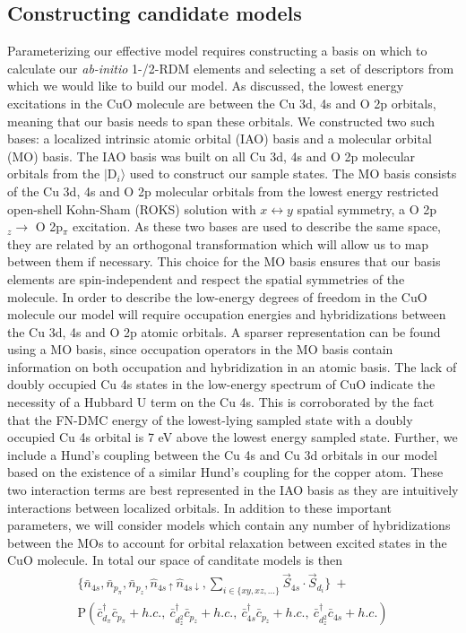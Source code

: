 \documentclass{article}
\begin{document}
\subsection{Constructing candidate models}
Parameterizing our effective model requires constructing a basis on which to calculate our \textit{ab-initio} 1-/2-RDM elements and selecting a set of descriptors from which we would like to build our model.
As discussed, the lowest energy excitations in the CuO molecule are between the Cu 3d, 4s and O 2p orbitals, meaning that our basis needs to span these orbitals. 
We constructed two such bases: a localized intrinsic atomic orbital (IAO) basis and a molecular orbital (MO) basis.
The IAO basis was built on all Cu 3d, 4s and O 2p molecular orbitals from the $|\text{D}_i\rangle$ used to construct our sample states.
The MO basis consists of the Cu 3d, 4s and O 2p molecular orbitals from the lowest energy restricted open-shell Kohn-Sham (ROKS) solution with $x \leftrightarrow y$ spatial symmetry, a O 2p$_z \rightarrow$ O 2p$_\pi$ excitation.
As these two bases are used to describe the same space, they are related by an orthogonal transformation which will allow us to map between them if necessary.
This choice for the MO basis ensures that our basis elements are spin-independent and respect the spatial symmetries of the molecule.
In order to describe the low-energy degrees of freedom in the CuO molecule our model will require occupation energies and hybridizations between the Cu 3d, 4s and O 2p atomic orbitals.
A sparser representation can be found using a MO basis, since occupation operators in the MO basis contain information on both occupation and hybridization in an atomic basis. 
The lack of doubly occupied Cu 4s states in the low-energy spectrum of CuO indicate the necessity of a Hubbard U term on the Cu 4s.
This is corroborated by the fact that the FN-DMC energy of the lowest-lying sampled state with a doubly occupied Cu 4s orbital is 7 eV above the lowest energy sampled state.
Further, we include a Hund's coupling between the Cu 4s and Cu 3d orbitals in our model based on the existence of a similar Hund's coupling 
for the copper atom.
These two interaction terms are best represented in the IAO basis as they are intuitively interactions between localized orbitals.
In addition to these important parameters, we will consider models which contain any number of hybridizations between the MOs to account for orbital relaxation between excited states in the CuO molecule.
In total our space of canditate models is then 
\begin{equation}
\begin{split}
\{\bar{n}_{4s}, \bar{n}_{p_\pi}, \bar{n}_{p_z}, \hat{n}_{4s\uparrow} \hat{n}_{4s\downarrow},\sum_{i \in \{xy, xz, ...\}}\vec{S}_{4s}\cdot \vec{S}_{d_i}\} \ + \\
\text{P}(\bar{c}_{d_\pi}^\dagger \bar{c}_{p_\pi} + h.c.,\ \bar{c}_{d_z^2}^\dagger \bar{c}_{p_z} + h.c.,\ \bar{c}_{4s}^\dagger \bar{c}_{p_z} + h.c.,\ \bar{c}_{d_z^2}^\dagger \bar{c}_{4s} + h.c.)
\end{split}
\label{eq:models}
\end{equation}
\end{document}
